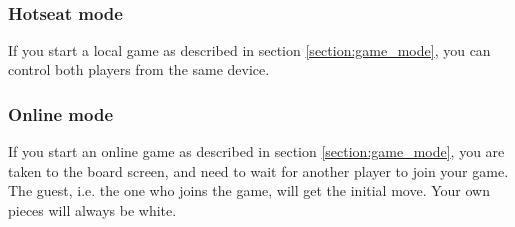 \begin{figure}[H]
	\mbox{ \qquad
	}
\end{figure}

\subsubsection{Hotseat mode}

If you start a local game as described in section \ref{section:game_mode}, you can control both players from the same device.

\subsubsection{Online mode}

If you start an online game as described in section \ref{section:game_mode}, you are taken to the board screen, and need to wait for another player to join your game. The guest, i.e. the one who joins the game, will get the initial move. Your own pieces will always be white.






